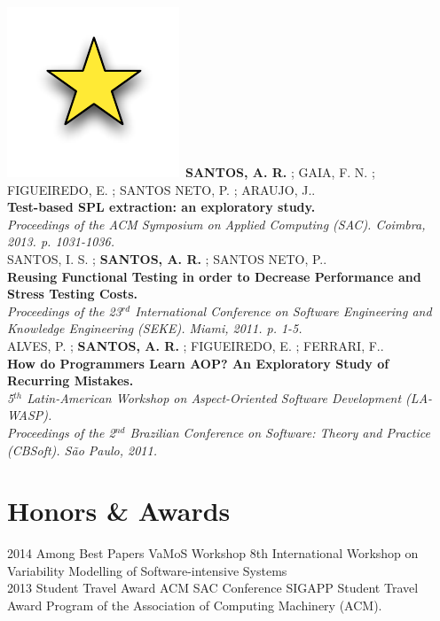\documentclass[nocolors]{friggeri-cv-a4}
\begin{document}
\includegraphics[scale=.15]{img/star.pdf}~\textbf{SANTOS, A. R.}  ; GAIA, F. N. ; FIGUEIREDO, E. ; SANTOS NETO, P. ; ARAUJO, J..\\
\textbf{Test-based SPL extraction: an exploratory study.} \\
\emph{Proceedings of the ACM Symposium on Applied Computing (SAC). Coimbra, 2013. p. 1031-1036.}\\

SANTOS, I. S. ; \textbf{SANTOS, A. R.}  ; SANTOS NETO, P..\\
\textbf{Reusing Functional Testing in order to Decrease Performance and Stress Testing Costs.}\\
\emph{Proceedings of the 23$^{rd}$ International Conference on Software Engineering and Knowledge Engineering (SEKE). Miami, 2011. p. 1-5.}\\

ALVES, P. ; \textbf{SANTOS, A. R.}  ; FIGUEIREDO, E. ; FERRARI, F..\\
\textbf{How do Programmers Learn AOP? An Exploratory Study of Recurring Mistakes.} \\
\emph{5$^{th}$ Latin-American Workshop on Aspect-Oriented Software Development (LA-WASP).\\
	Proceedings of the 2$^{nd}$ Brazilian Conference on Software: Theory and Practice (CBSoft). São Paulo, 2011.}\\

\section{Honors \& Awards}
\begin{entrylist}
	\entry
	{2014}
	{Among Best Papers}
	{VaMoS Workshop}
	{8th International Workshop on Variability Modelling of Software-intensive Systems}\\
	
	\entry
	{2013}
	{Student Travel Award}
	{ACM SAC Conference}
	{SIGAPP Student Travel Award Program of the Association of Computing Machinery (ACM).}\\
\end{entrylist}
\end{document}
